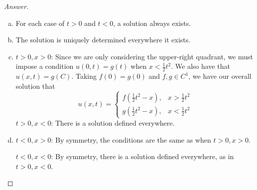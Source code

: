 \documentclass{article}
\theoremstyle{definition}
\renewcommand\qedsymbol{$\blacksquare$}
\newenvironment{ans}{\begin{proof}[Answer]\renewcommand{\qedsymbol}{}}{\end{proof}}
\begin{document}
\begin{ans}
\begin{enumerate}[(1), series=answers]
\begin{enumerate}[a)]
                    \begin{center}
                    \end{center}
                    
                    \item For each case of $t > 0$ and $t < 0$, a solution always exists.

                    \item The solution is uniquely determined everywhere it exists.

                    \item \underline{$t > 0, x > 0$}: Since we are only considering the upper-right quadrant, we must impose a condition $u(0,t) = g(t)$ when $x < \frac{1}{2}t^2$. We also have that $u(x,t) = g(C)$. Taking $f(0) = g(0)$ and $f,g\in C^1$, we have our overall solution that
                    \begin{equation*}
                    u(x,t) =
                    \begin{cases}
                        f\left(\frac{1}{2}t^2 - x\right), & x > \frac{1}{2}t^2\\
                        g\left(\frac{1}{2}t^2 - x\right), & x < \frac{1}{2}t^2
                    \end{cases}
                    \end{equation*}
                    \underline{$t > 0, x < 0$}: There is a solution defined everywhere.

                    \item \underline{$t < 0, x > 0$}: By symmetry, the conditions are the same as when $t > 0, x > 0$.
                    
                    \underline{$t < 0, x < 0$}: By symmetry, there is a solution defined everywhere, as in $t > 0, x < 0$.
                \end{enumerate}
			

\end{enumerate}
\end{ans}
\end{document}
